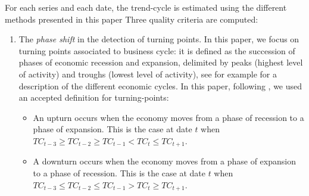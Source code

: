 \documentclass[
]{article}
\providecommand{\tightlist}{%
  \setlength{\itemsep}{0pt}\setlength{\parskip}{0pt}}\usepackage{longtable,booktabs,array}
\newcommand\1{\mathds{1}}
\begin{document}
For each series and each date, the trend-cycle is estimated using the
different methods presented in this paper Three quality criteria are
computed:

\begin{enumerate}
\def\labelenumi{\arabic{enumi}.}
\item
  The \emph{phase shift} in the detection of turning points. In this
  paper, we focus on turning points associated to business cycle: it is
  defined as the succession of phases of economic recession and
  expansion, delimited by peaks (highest level of activity) and troughs
  (lowest level of activity), see for example \textcite{ferrara} for a
  description of the different economic cycles. In this paper, following
  \textcite{Zellner1991}, we used an accepted definition for
  turning-points:

  \begin{itemize}
  \tightlist
  \item
    An upturn occurs when the economy moves from a phase of recession to
    a phase of expansion. This is the case at date \(t\) when
    \(TC_{t-3}\geq TC_{t-2}\geq TC_{t-1}<TC_t\leq TC_{t+1}\).\\
  \item
    A downturn occurs when the economy moves from a phase of expansion
    to a phase of recession. This is the case at date \(t\) when
    \(TC_{t-3}\leq TC_{t-2}\leq TC_{t-1}>TC_t\geq TC_{t+1}\).
  \end{itemize}


\end{enumerate}
\end{document}
